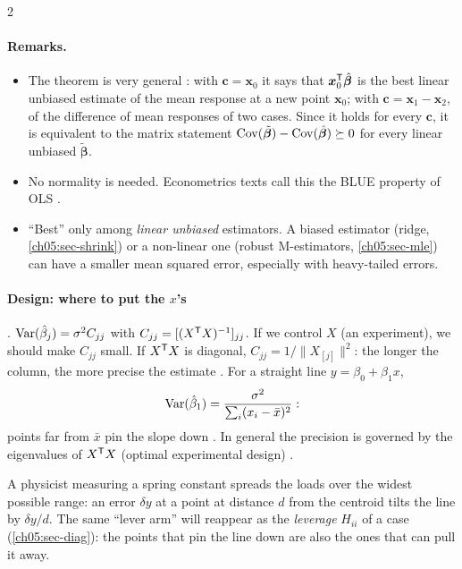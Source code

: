 \begin{paracol}{2}
\paragraph{Remarks.}
\begin{itemize}
  \item The theorem is very general : with $\bm c=\bm x_0$ it says that $\bm x_0^{\mathsf T}\hat{\bm\beta}$ is the best
        linear unbiased estimate of the mean response at a new point $\bm x_0$; with $\bm c=\bm x_1-\bm x_2$, of the
        difference of mean responses of two cases. Since it holds for every $\bm c$, it is equivalent to the
        matrix statement $\operatorname{Cov}(\tilde{\bm\beta})-\operatorname{Cov}(\hat{\bm\beta})\succeq0$ for every linear unbiased $\tilde{\bm\beta}$.
  \item No normality is needed. Econometrics texts call this the BLUE property of OLS .
  \item ``Best'' only among \emph{linear unbiased} estimators. A biased estimator (ridge,
        \cref{ch05:sec-shrink}) or a non-linear one (robust M-estimators, \cref{ch05:sec-mle}) can have a smaller
        mean squared error, especially with heavy-tailed errors.
\end{itemize}

\paragraph{Design: where to put the $x$'s} . $\operatorname{Var}(\hat\beta_j)=\sigma^2C_{jj}$ with
$C_{jj}=[(X^{\mathsf T} X)^{-1}]_{jj}$. If we control $X$ (an experiment), we should make $C_{jj}$ small. If $X^{\mathsf T} X$ is
diagonal, $C_{jj}=1/\|X_{[j]}\|^2$: the longer the column, the more precise the estimate . For a
straight line $y=\beta_0+\beta_1x$,
\[
  \operatorname{Var}(\hat\beta_1)=\frac{\sigma^2}{\sum_i(x_i-\bar x)^2}:
\]
points far from $\bar x$ pin the slope down . In general the precision is governed by the
eigenvalues of $X^{\mathsf T} X$ (optimal experimental design) .

\begin{intuition}
A physicist measuring a spring constant spreads the loads over the widest possible range: an error
$\delta y$ at a point at distance $d$ from the centroid tilts the line by $\delta y/d$. The same ``lever arm'' will
reappear as the \emph{leverage} $H_{ii}$ of a case (\cref{ch05:sec-diag}): the points that pin the line down are
also the ones that can pull it away.
\end{intuition}


\end{paracol}
